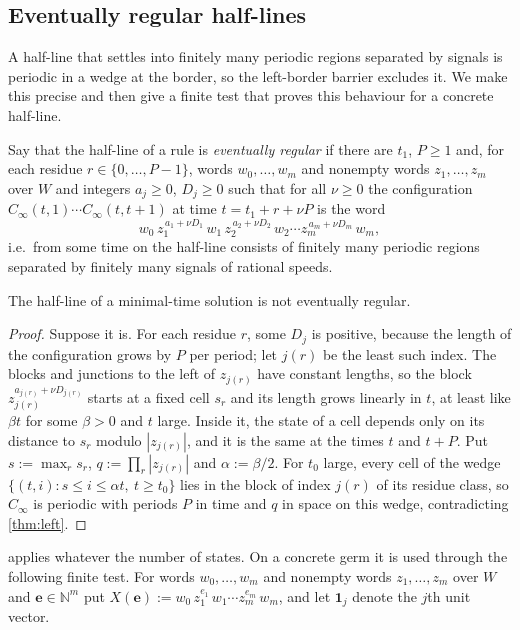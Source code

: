 \subsection{Eventually regular half-lines}\label{sec:regular}

A half-line that settles into finitely many periodic regions separated by
signals is periodic in a wedge at the border, so the left-border barrier
excludes it. We make this precise and then give a finite test that proves
this behaviour for a concrete half-line.

Say that the half-line of a rule is \emph{eventually regular} if there are
$t_1$, $P\ge1$ and, for each residue $r\in\{0,\dots,P-1\}$, words
$w_0,\dots,w_m$ and nonempty words $z_1,\dots,z_m$ over $W$ and integers
$a_j\ge0$, $D_j\ge0$
such that for all $\nu\ge0$ the configuration $C_\infty(t,1)\cdots
C_\infty(t,t+1)$ at time $t=t_1+r+\nu P$ is the word
\[
w_0\,z_1^{\,a_1+\nu D_1}\,w_1\,z_2^{\,a_2+\nu D_2}\,w_2\cdots z_m^{\,a_m+\nu D_m}\,w_m ,
\]
i.e.\ from some time on the half-line consists of finitely many periodic
regions separated by finitely many signals of rational speeds.

\begin{corollary}\label{cor:regular}
The half-line of a minimal-time solution is not eventually regular.
\end{corollary}

\begin{proof}
Suppose it is. For each residue $r$, some $D_j$ is positive, because the
length of the configuration grows by $P$ per period; let $j(r)$ be the
least such index. The blocks and junctions to the left of $z_{j(r)}$ have
constant lengths, so the block $z_{j(r)}^{a_{j(r)}+\nu D_{j(r)}}$ starts at a
fixed cell $s_r$ and its length grows linearly in $t$, at least like
$\beta t$ for some $\beta>0$ and $t$ large. Inside it, the state of a cell
depends only on its distance to $s_r$ modulo $|z_{j(r)}|$, and it is the
same at the times $t$ and $t+P$. Put $s:=\max_r s_r$, $q:=\prod_r|z_{j(r)}|$
and $\alpha:=\beta/2$. For $t_0$ large, every cell of the wedge
$\{(t,i): s\le i\le\alpha t,\ t\ge t_0\}$ lies in the block of index $j(r)$
of its residue class, so $C_\infty$ is periodic with periods $P$ in time
and $q$ in space on this wedge, contradicting \cref{thm:left}.
\end{proof}

 applies whatever the number of states. On a concrete
germ it is used through the following finite test. For words $w_0,\dots,w_m$
and nonempty words $z_1,\dots,z_m$ over $W$ and $\mathbf e\in\mathbb N^m$ put
$X(\mathbf e):=w_0\,z_1^{e_1}\,w_1\cdots z_m^{e_m}\,w_m$, and let
$\mathbf 1_j$ denote the $j$th unit vector.

